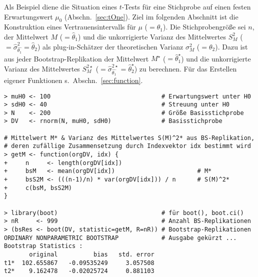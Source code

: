 Als Beispiel diene die Situation eines $t$-Tests für eine Stichprobe auf einen festen Erwartungswert $\mu_{0}$ (Abschn.\ \ref{sec:tOne}). Ziel im folgenden Abschnitt ist die Konstruktion eines Vertrauensintervalls für $\mu$ ($= \theta_{1}$). Die Stichprobengröße sei $n$, der Mittelwert $M$ ($= \hat{\theta}_{1}$) und die unkorrigierte Varianz des Mittelwertes $S_{M}^{2}$ ($= \hat{\sigma}_{\hat{\theta_{1}}}^{2} = \hat{\theta}_{2}$) als plug-in-Schätzer der theoretischen Varianz $\sigma_{M}^{2}$ ($= \theta_{2}$). Dazu ist aus jeder Bootstrap-Replikation der Mittelwert $M^{\star}$ ($= \hat{\theta}_{1}^{\star}$) und die unkorrigierte Varianz des Mittelwertes $S_{M}^{2 \star}$ ($= \hat{\sigma}_{\hat{\theta_{1}}}^{2 \star} = \hat{\theta}_{2}^{\star}$) zu berechnen. Für das Erstellen eigener Funktionen s.\ Abschn.\ \ref{sec:function}.
\begin{lstlisting}
> muH0 <- 100                               # Erwartungswert unter H0
> sdH0 <- 40                                # Streuung unter H0
> N    <- 200                               # Größe Basisstichprobe
> DV   <- rnorm(N, muH0, sdH0)              # Basisstichprobe

# Mittelwert M* & Varianz des Mittelwertes S(M)^2* aus BS-Replikation,
# deren zufällige Zusammensetzung durch Indexvektor idx bestimmt wird
> getM <- function(orgDV, idx) {
+     n     <- length(orgDV[idx])
+     bsM   <- mean(orgDV[idx])                       # M*
+     bsS2M <- (((n-1)/n) * var(orgDV[idx])) / n      # S(M)^2*
+     c(bsM, bsS2M)
}

> library(boot)                             # für boot(), boot.ci()
> nR     <- 999                             # Anzahl BS-Replikationen
> (bsRes <- boot(DV, statistic=getM, R=nR)) # Bootstrap-Replikationen
ORDINARY NONPARAMETRIC BOOTSTRAP            # Ausgabe gekürzt ...
Bootstrap Statistics :
       original          bias   std. error
t1*  102.655867   -0.09535249     3.057508
t2*    9.162478   -0.02025724     0.881103
\end{lstlisting}

